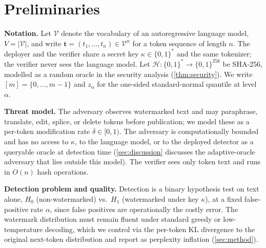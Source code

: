 \section{Preliminaries}
\label{sec:prelim}

\textbf{Notation.} Let $\mathcal{V}$ denote the vocabulary of an
autoregressive language model, $V = |\mathcal{V}|$, and write
$\mathbf{t} = (t_1, \ldots, t_n) \in \mathcal{V}^n$ for a token
sequence of length $n$. The deployer and the verifier share a secret
key $\kappa \in \{0,1\}^*$ and the same tokenizer; the verifier
never sees the language model. Let
$\mathcal{H} : \{0,1\}^* \to \{0,1\}^{256}$ be SHA-256, modelled as
a random oracle in the security analysis (\autoref{thm:security}).
We write $[m] = \{0, \ldots, m-1\}$ and $z_\alpha$ for the one-sided
standard-normal quantile at level $\alpha$.

\textbf{Threat model.} The adversary observes watermarked text and
may paraphrase, translate, edit, splice, or delete tokens before
publication; we model these as a per-token modification rate
$\delta \in [0,1)$. The adversary is computationally bounded and
has no access to $\kappa$, to the language model, or to the
deployed detector as a queryable oracle at detection time
(\autoref{sec:discussion} discusses the adaptive-oracle adversary
that lies outside this model). The verifier sees only token text and runs in $O(n)$ hash
operations.

\textbf{Detection problem and quality.} Detection is a binary
hypothesis test on text alone, $H_0$ (non-watermarked) vs.\ $H_1$
(watermarked under key $\kappa$), at a fixed false-positive rate
$\alpha$, since false positives are operationally the costly error.
The watermark distribution must remain fluent under standard greedy
or low-temperature decoding, which we control via the per-token KL
divergence to the original next-token distribution and report as
perplexity inflation (\autoref{sec:method}).
